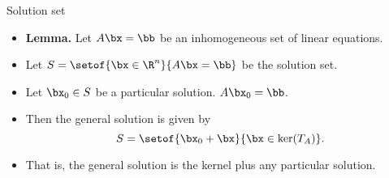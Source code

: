 \documentclass{beamer}
\begin{document}
\begin{frame}{Solution set}

\begin{itemize}
\item \textbf{Lemma.} Let $A\bx=\bb$ be an inhomogeneous set of linear equations.
\item Let $S=\setof{\bx \in \R^n}{A \bx = \bb}$ be the solution set.
\item Let $\bx_0\in S$ be a particular solution. $A\bx_0=\bb$.
\item Then the general solution is given by
$$S=\setof{\bx_0 + \bx}{\bx\in\ker(T_A)}.$$
\item That is, the general solution is the kernel plus any particular solution.
\end{itemize}

\end{frame}
\end{document}
